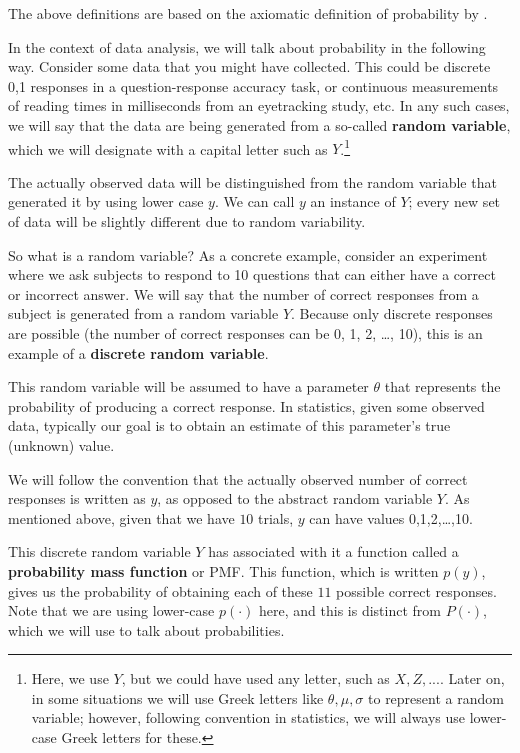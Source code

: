 \documentclass[12pt,]{krantz}
\theoremstyle{definition}
\theoremstyle{definition}
\theoremstyle{definition}
\theoremstyle{remark}
\begin{document}
The above definitions are based on the axiomatic definition of probability by \citet{kolmogorov2018foundations}.

In the context of data analysis, we will talk about probability in the following way. Consider some data that you might have collected. This could be discrete 0,1 responses in a question-response accuracy task, or continuous measurements of reading times in milliseconds from an eyetracking study, etc. In any such cases, we will say that the data are being generated from a so-called \textbf{random variable}, which we will designate with a capital letter such as \(Y\).\footnote{Here, we use \(Y\), but we could have used any letter, such as \(X, Z,...\). Later on, in some situations we will use Greek letters like \(\theta, \mu, \sigma\) to represent a random variable; however, following convention in statistics, we will always use lower-case Greek letters for these.}

The actually observed data will be distinguished from the random variable that generated it by using lower case \(y\). We can call \(y\) an instance of \(Y\); every new set of data will be slightly different due to random variability.

So what is a random variable? As a concrete example, consider an experiment where we ask subjects to respond to 10 questions that can either have a correct or incorrect answer. We will say that the number of correct responses from a subject is generated from a random variable \(Y\). Because only discrete responses are possible (the number of correct responses can be 0, 1, 2, \ldots{}, 10), this is an example of a \textbf{discrete random variable}.

This random variable will be assumed to have a parameter \(\theta\) that represents the probability of producing a correct response. In statistics, given some observed data, typically our goal is to obtain an estimate of this parameter's true (unknown) value.

We will follow the convention that the actually observed number of correct responses is written as \(y\), as opposed to the abstract random variable \(Y\). As mentioned above, given that we have \(10\) trials, \(y\) can have values 0,1,2,\ldots{},10.

This discrete random variable \(Y\) has associated with it a function called a \textbf{probability mass function} or PMF. This function, which is written \(p(y)\), gives us the probability of obtaining each of these \(11\) possible correct responses. Note that we are using lower-case \(p(\cdot)\) here, and this is distinct from \(P(\cdot)\), which we will use to talk about probabilities.
\end{document}
